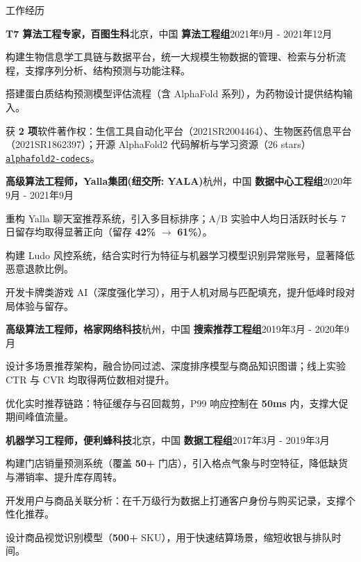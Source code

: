 \documentclass{resume} %
\newcommand{\repo}[2]{\href{#2}{\small\nolinkurl{#1}}}
\begin{document}
\begin{rSection}{工作经历}
\begin{rSubsection}{\textbf{T7 算法工程专家，百图生科}}{北京，中国}
{\textbf{算法工程组}}{2021年9月 - 2021年12月}
\item {构建生物信息学工具链与数据平台，统一大规模生物数据的管理、检索与分析流程，支撑序列分析、结构预测与功能注释。}\\
\item {搭建蛋白质结构预测模型评估流程（含 AlphaFold 系列），为药物设计提供结构输入。}\\
\item {获 {\textbf{2 项}}软件著作权：生信工具自动化平台（2021SR2004464）、生物医药信息平台（2021SR1862397）；开源 AlphaFold2 代码解析与学习资源（26 stars） \repo{alphafold2-codecs}{https://github.com/chenxingqiang/alphafold2-codecs}。}\\
\end{rSubsection}

\begin{rSubsection}{\textbf{高级算法工程师，Yalla集团(纽交所: YALA)}}{杭州，中国}
{\textbf{数据中心工程组}}{2020年9月 - 2021年9月}
\item {重构 Yalla 聊天室推荐系统，引入多目标排序；A/B 实验中人均日活跃时长与 7 日留存均取得显著正向（留存 {\textbf{42\%}} $\rightarrow$ {\textbf{61\%}}）。}\\
\item {构建 Ludo 风控系统，结合实时行为特征与机器学习模型识别异常账号，显著降低恶意退款比例。}\\
\item {开发卡牌类游戏 AI（深度强化学习），用于人机对局与匹配填充，提升低峰时段对局体验与留存。}\\
\end{rSubsection}

\begin{rSubsection}{\textbf{高级算法工程师，格家网络科技}}{杭州，中国}
{\textbf{搜索推荐工程组}}{2019年3月 - 2020年9月}
\item {设计多场景推荐架构，融合协同过滤、深度排序模型与商品知识图谱；线上实验 CTR 与 CVR 均取得两位数相对提升。}\\
\item {优化实时推荐链路：特征缓存与召回裁剪，P99 响应控制在 {\textbf{50ms}} 内，支撑大促期间峰值流量。}\\
\end{rSubsection}

\begin{rSubsection}{\textbf{机器学习工程师，便利蜂科技}}{北京，中国}
{\textbf{数据工程组}}{2017年3月 - 2019年3月}
\item {构建门店销量预测系统（覆盖 {\textbf{50+}} 门店），引入格点气象与时空特征，降低缺货与滞销率、提升库存周转。}\\
\item {开发用户与商品关联分析：在千万级行为数据上打通客户身份与购买记录，支撑个性化推荐。}\\
\item {设计商品视觉识别模型（{\textbf{500+}} SKU），用于快速结算场景，缩短收银与排队时间。}\\
\end{rSubsection}

\end{rSection}
\end{document}

